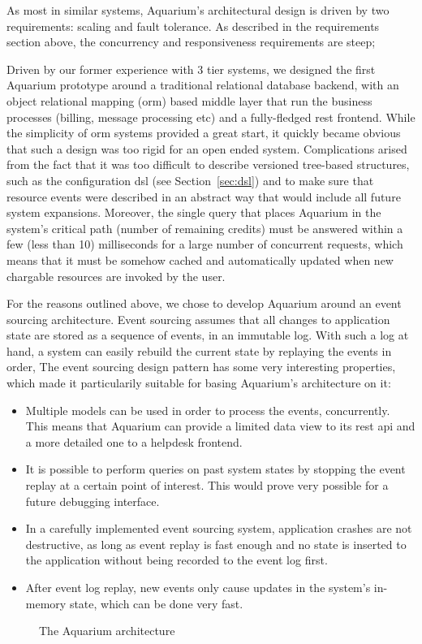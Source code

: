 As most in similar systems, Aquarium's architectural design is driven by two 
requirements: scaling and fault tolerance. As described in the requirements
section above, the concurrency and responsiveness requirements are steep;

Driven by our former experience with 3 tier systems, we designed the first
Aquarium prototype around a traditional relational database backend, with an
object relational mapping ({\sc orm}) based middle layer that run the business
processes (billing, message processing etc) and a fully-fledged {\sc rest}
frontend. While the simplicity of {\sc orm} systems provided a great start,
it quickly became obvious that such a design was too rigid for an open 
ended system. Complications arised from the fact that it was too difficult
to describe versioned tree-based structures, such as the configuration {\sc dsl} 
(see Section~\ref{sec:dsl}) and to make sure that resource events were
described in an abstract way that would include all future system expansions.
Moreover, the single query that places Aquarium in the system's critical 
path (number of remaining credits) must be answered within a few (less than
10) milliseconds for a large number of concurrent requests, which means that
it must be somehow cached and automatically updated when new chargable 
resources are invoked by the user.

For the reasons outlined above, we chose to develop Aquarium around an event
sourcing architecture. Event sourcing assumes that all changes to application
state are stored as a sequence of events, in an immutable log. With such a 
log at hand, a system can easily rebuild the current state by replaying the
events in order, The event sourcing
design pattern has some very interesting properties, which made it particularily
suitable for basing Aquarium's architecture on it:

\begin{itemize}

    \item Multiple models can be used in order to process the events, 
        concurrently. This means that Aquarium can provide a limited
        data view to its {\sc rest api} and a more detailed one to a
        helpdesk frontend.

    \item It is possible to perform queries on past system states by stopping
        the event replay at a certain point of interest. This would prove very
        possible for a future debugging interface.

    \item In a carefully implemented event sourcing system, application crashes 
        are not destructive, as long as event replay is fast enough and no
        state is inserted to the application without being recorded to the event
        log first.

    \item After event log replay, new events only cause updates in the system's
        in-memory state, which can be done very fast.

\end{itemize}

\begin{figure}

\caption{The Aquarium architecture} 
\label{fig:arch}
\end{figure}
